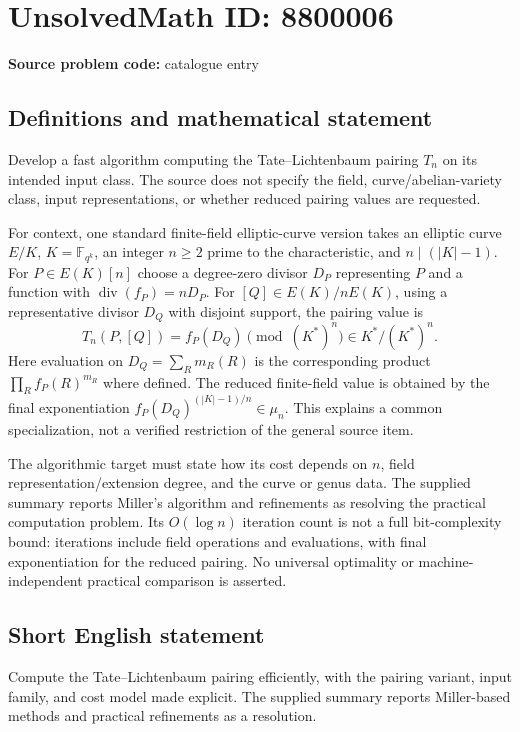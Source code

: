 \documentclass[11pt]{article}
\begin{document}
\section*{UnsolvedMath ID: 8800006}
\textbf{Source problem code:} catalogue entry
\subsection{Definitions and mathematical statement}
Develop a fast algorithm computing the Tate--Lichtenbaum pairing $T_n$ on its intended input class. The source does not specify the field, curve/abelian-variety class, input representations, or whether reduced pairing values are requested.

For context, one standard finite-field elliptic-curve version takes an elliptic curve $E/K$, $K=\mathbb F_{q^k}$, an integer $n\geq2$ prime to the characteristic, and $n\mid(|K|-1)$. For $P\in E(K)[n]$ choose a degree-zero divisor $D_P$ representing $P$ and a function with $\operatorname{div}(f_P)=nD_P$. For $[Q]\in E(K)/nE(K)$, using a representative divisor $D_Q$ with disjoint support, the pairing value is
\[
T_n(P,[Q])=f_P(D_Q)\pmod{(K^*)^n}\in K^*/(K^*)^n.
\]
Here evaluation on $D_Q=\sum_R m_R(R)$ is the corresponding product $\prod_R f_P(R)^{m_R}$ where defined. The reduced finite-field value is obtained by the final exponentiation $f_P(D_Q)^{(|K|-1)/n}\in\mu_n$. This explains a common specialization, not a verified restriction of the general source item.

The algorithmic target must state how its cost depends on $n$, field representation/extension degree, and the curve or genus data. The supplied summary reports Miller's algorithm and refinements as resolving the practical computation problem. Its $O(\log n)$ iteration count is not a full bit-complexity bound: iterations include field operations and evaluations, with final exponentiation for the reduced pairing. No universal optimality or machine-independent practical comparison is asserted.
\subsection{Short English statement}
Compute the Tate--Lichtenbaum pairing efficiently, with the pairing variant, input family, and cost model made explicit. The supplied summary reports Miller-based methods and practical refinements as a resolution.
\end{document}
